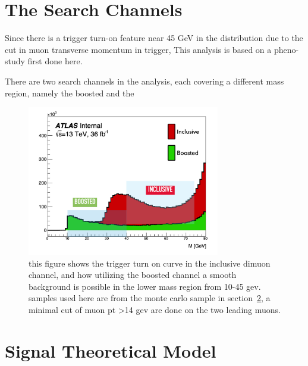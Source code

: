 %
%    


\section{The Search Channels}
Since there is a trigger turn-on feature near 45 GeV in the distribution due to the cut in muon transverse momentum in trigger, 
This analysis is based on a pheno-study first done here\cite{2014}.

There are two search channels in the analysis, each covering a different mass region, namely the boosted and the 

\begin{figure}[!htb]
    \begin{center}
        \includegraphics[width=0.75\textwidth]{figures/chapter_dimuon/turnon}
        \caption{
        this figure shows the trigger turn on curve in the inclusive dimuon channel, and how utilizing the boosted channel a smooth background is possible in the lower mass region from 10-45 gev. samples used here are from the monte carlo sample in section~\ref{}, a minimal cut of muon pt >14 gev are done on the two leading muons. }
            \label{fig:turnon}
    \end{center}
\end{figure}

\section{Signal Theoretical Model}

